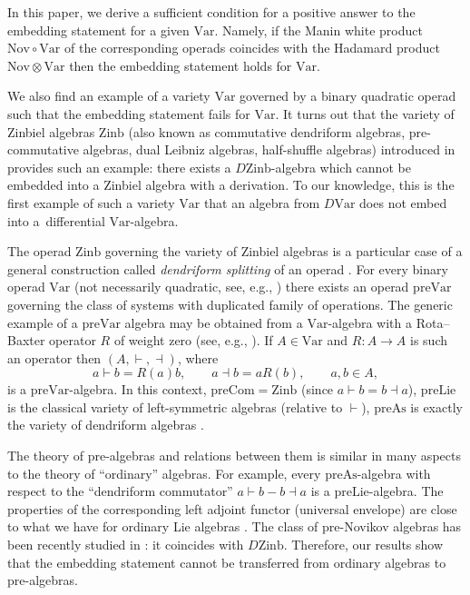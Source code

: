 \documentclass[11pt]{article}
\numberwithin{equation}{section}
\numberwithin{equation}{section}
\def\Var{\mathrm{Var}}
\def\Nov{\mathrm{Nov}}
\def\Com{\mathrm{Com}}
\def\As{\mathrm{As}}
\def\Lie{\mathrm{Lie}}
\def\Zinb{\mathrm{Zinb}}
\def\pre{\mathrm{pre}}
\begin{document}
In this paper, we derive a sufficient condition for a positive
answer to the embedding statement for a given $\Var $.
Namely, if the Manin white product $\Nov\circ \Var$ of the corresponding operads coincides with the Hadamard product
$\Nov\otimes \Var $ then the embedding statement holds for $\Var$.

We also find an example of a variety $\Var $ governed by
a binary quadratic operad such that the embedding
statement fails for $\Var$. It turns out that
the variety of Zinbiel algebras $\Zinb $ (also known as commutative dendriform algebras, pre-commutative algebras, dual Leibniz algebras, half-shuffle algebras) introduced in \cite{Loday} provides such an example:
there exists a $D\Zinb $-algebra which cannot be embedded into a Zinbiel algebra with a derivation.
To our knowledge, this is the first example of such a variety $\Var$ that an algebra from $D\Var$ does not embed into a~differential $\Var$-algebra.

The operad $\Zinb $ governing the variety of Zinbiel algebras
is a particular case of a general construction called {\em dendriform splitting} of an operad \cite{BBGN}.
For every binary operad $\Var $ (not necessarily quadratic,
see, e.g., \cite{GubKol2014}) there exists an operad
$\pre\Var $ governing the class of systems with duplicated
family of operations. The generic example of a $\pre\Var$ algebra may be obtained from a $\Var$-algebra
with a Rota--Baxter operator $R$ of weight zero
(see, e.g., \cite{LiGuo_RBABook}).
If $A\in \Var$ and $R\colon A\to A$ is such an operator then
$(A,\vdash, \dashv)$, where
\[
a\vdash b = R(a)b,\qquad a\dashv b = aR(b), \qquad a,b\in A,
\]
is a $\pre\Var $-algebra.
In this context,
$\pre\Com =\Zinb$ (since $a\vdash b = b\dashv a$),
$\pre\Lie$ is the classical variety of left-symmetric algebras (relative to $\vdash $), $\pre\As$ is exactly the variety of dendriform algebras \cite{Loday}.

The theory of pre-algebras and relations between them is similar
in many aspects to the theory of ``ordinary'' algebras.
For example, every $\pre\As $-algebra with respect to the ``dendriform commutator'' $a\vdash b - b\dashv a$ is a $\pre\Lie$-algebra. The properties of the corresponding left adjoint functor (universal envelope) are close to what we have
for ordinary Lie algebras
\cite{DotsTamaroff, Gubarev}.
The class of pre-Novikov algebras has been recently studied in \cite{Hong2023}: it coincides with $D\Zinb $.
Therefore, our results show that the embedding statement
cannot be transferred from ordinary algebras to pre-algebras.
\end{document}
